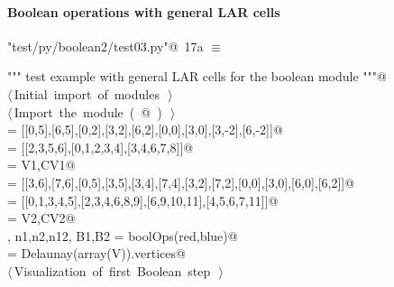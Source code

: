 \documentclass[11pt,oneside]{article}	%
\begin{document}
\paragraph{Boolean operations with general LAR cells}

\begin{flushleft} \small
\begin{minipage}{\linewidth} \label{scrap37}
\protect{}\verb@"test/py/boolean2/test03.py"@\nobreak\ {\footnotesize 17a }$\equiv$
\vspace{-1ex}
\begin{list}{}{} \item
\mbox{}\verb@""" test example with general LAR cells for the boolean module """@\\
\mbox{}\verb@@\hbox{$\langle\,$Initial import of modules\nobreak\ {\footnotesize {}}$\,\rangle$}\verb@@\\
\mbox{}\verb@@\hbox{$\langle\,$Import the module\nobreak\ ({\footnotesize {}\label{scrap38}
 }\mbox{}@ ) {\footnotesize {}}$\,\rangle$}\verb@@\\
\mbox{} = [[0,5],[6,5],[0,2],[3,2],[6,2],[0,0],[3,0],[3,-2],[6,-2]]@\\
\mbox{} = [[2,3,5,6],[0,1,2,3,4],[3,4,6,7,8]]@\\
\mbox{}\verb@blue = V1,CV1@\\
\mbox{} = [[3,6],[7,6],[0,5],[3,5],[3,4],[7,4],[3,2],[7,2],[0,0],[3,0],[6,0],[6,2]]@\\
\mbox{} = [[0,1,3,4,5],[2,3,4,6,8,9],[6,9,10,11],[4,5,6,7,11]]@\\
\mbox{}\verb@red = V2,CV2@\\
\mbox{}\verb@V, n1,n2,n12, B1,B2 = boolOps(red,blue)@\\
\mbox{}\verb@CV = Delaunay(array(V)).vertices@\\
\mbox{}\verb@@\hbox{$\langle\,$Visualization of first Boolean step\nobreak\ {\footnotesize {}}$\,\rangle$}\verb@@\\
\mbox{}\verb@@{\NWsep}
\end{list}
\vspace{-2ex}
\end{minipage}\\[4ex]
\end{flushleft}
\end{document}
